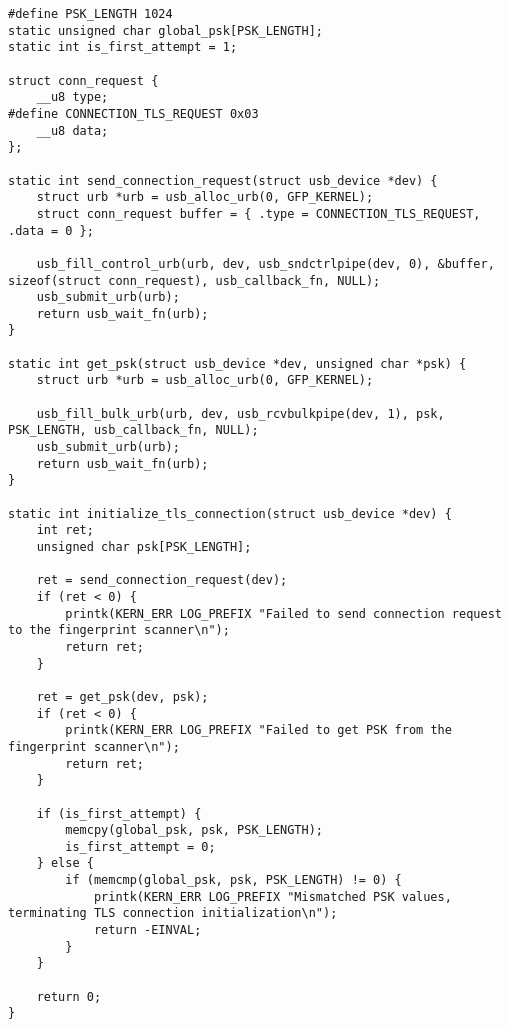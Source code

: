 \begin{lstlisting}[caption={Инициализация TLS-соединения}]
#define PSK_LENGTH 1024
static unsigned char global_psk[PSK_LENGTH];
static int is_first_attempt = 1;

struct conn_request {
    __u8 type;
#define CONNECTION_TLS_REQUEST 0x03
    __u8 data;
};

static int send_connection_request(struct usb_device *dev) {
    struct urb *urb = usb_alloc_urb(0, GFP_KERNEL);
    struct conn_request buffer = { .type = CONNECTION_TLS_REQUEST, .data = 0 };

    usb_fill_control_urb(urb, dev, usb_sndctrlpipe(dev, 0), &buffer, sizeof(struct conn_request), usb_callback_fn, NULL);
    usb_submit_urb(urb);
    return usb_wait_fn(urb);
}

static int get_psk(struct usb_device *dev, unsigned char *psk) {
    struct urb *urb = usb_alloc_urb(0, GFP_KERNEL);
    
    usb_fill_bulk_urb(urb, dev, usb_rcvbulkpipe(dev, 1), psk, PSK_LENGTH, usb_callback_fn, NULL);
    usb_submit_urb(urb);
    return usb_wait_fn(urb);
}

static int initialize_tls_connection(struct usb_device *dev) {
    int ret;
    unsigned char psk[PSK_LENGTH];

    ret = send_connection_request(dev);
    if (ret < 0) {
        printk(KERN_ERR LOG_PREFIX "Failed to send connection request to the fingerprint scanner\n");
        return ret;
    }

    ret = get_psk(dev, psk);
    if (ret < 0) {
        printk(KERN_ERR LOG_PREFIX "Failed to get PSK from the fingerprint scanner\n");
        return ret;
    }

    if (is_first_attempt) {
        memcpy(global_psk, psk, PSK_LENGTH);
        is_first_attempt = 0;
    } else {
        if (memcmp(global_psk, psk, PSK_LENGTH) != 0) {
            printk(KERN_ERR LOG_PREFIX "Mismatched PSK values, terminating TLS connection initialization\n");
            return -EINVAL;
        }
    }

    return 0;
}
\end{lstlisting}
